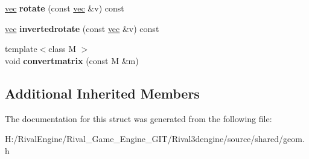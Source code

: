 \begin{DoxyCompactItemize}
\item 
\mbox{\label{structquat_a21e9f7caf2242b7bbdc2ffbd86f23367}} 
\hyperlink{structvec}{vec} {\bfseries rotate} (const \hyperlink{structvec}{vec} \&v) const
\item 
\mbox{\label{structquat_a44cf4ca4291dee43087b008ca15f5682}} 
\hyperlink{structvec}{vec} {\bfseries invertedrotate} (const \hyperlink{structvec}{vec} \&v) const
\item 
\mbox{\label{structquat_ad24ce4136a1ce2b212ba153b575ae327}} 
{\footnotesize template$<$class M $>$ }\\void {\bfseries convertmatrix} (const M \&m)
\end{DoxyCompactItemize}
\subsection*{Additional Inherited Members}


The documentation for this struct was generated from the following file\+:\begin{DoxyCompactItemize}
\item 
H\+:/\+Rival\+Engine/\+Rival\+\_\+\+Game\+\_\+\+Engine\+\_\+\+G\+I\+T/\+Rival3dengine/source/shared/geom.\+h\end{DoxyCompactItemize}
